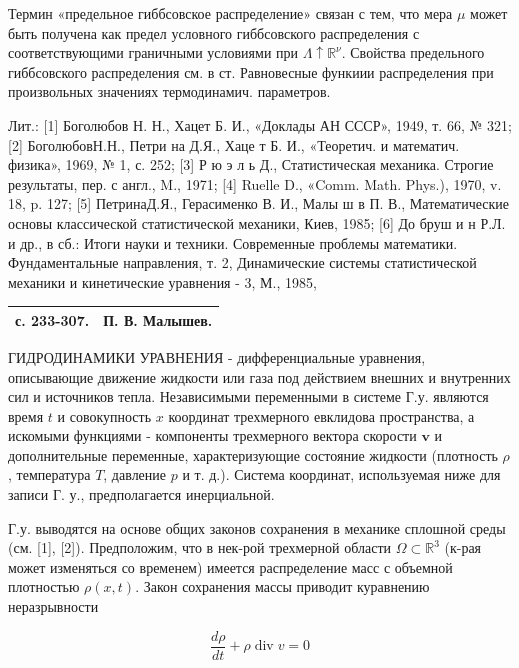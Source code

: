 \documentclass[10pt]{article}
\begin{document}
Термин «предельное гиббсовское распределение» связан с тем, что мера $\mu$ может быть получена как предел условного гиббсовского распределения с соответствующими граничными условиями при $\Lambda \uparrow \mathbb{R}^{\nu}$. Свойства предельного гиббсовского распределения см. в ст. Равновесные функиии распределения при произвольных значениях термодинамич. параметров.



Лит.: [1] Боголюбов Н. Н., Хацет Б. И., «Доклады АН СССР», 1949, т. 66, № 321; [2] БоголюбовН.Н., Петри на Д.Я., Хаце т Б. И., «Теоретич. и математич. физика», 1969, № 1, с. 252; [3] Р ю э л ь Д., Статистическая механика. Строгие результаты, пер. с англ., M., 1971; [4] Ruelle D., «Comm. Math. Phys.), 1970, v. 18, p. 127; [5] ПетринаД.Я., Герасименко В. И., Малы ш в П. В., Математические основы классической статистической механики, Киев, 1985; [6] До бруш и н Р.Л. и др., в сб.: Итоги науки и техники. Современные проблемы математики. Фундаментальные направления, т. 2, Динамические системы статистической механики и кинетические уравнения - 3, М., 1985, \begin{tabular}{ll}

с. 233-307. & П. В. Малышев. \\

\hline

\end{tabular}



ГИДРОДИНАМИКИ УРАВНЕНИЯ - дифференциальные уравнения, описывающие движение жидкости или газа под действием внешних и внутренних сил и источников тепла. Независимыми переменными в системе Г.у. являются время $t$ и совокупность $x$ координат трехмерного евклидова пространства, а искомыми функциями - компоненты трехмерного вектора скорости $\boldsymbol{v}$ и дополнительные переменные, характеризующие состояние жидкости (плотность $\rho$, температура $T$, давление $p$ и т. д.). Система координат, используемая ниже для записи Г. у., предполагается инерциальной.



Г.у. выводятся на основе общих законов сохранения в механике сплошной среды (см. [1], [2]). Предположим, что в нек-рой трехмерной области $\Omega \subset \mathbb{R}^{3}$ (к-рая может изменяться со временем) имеется распределение масс с объемной плотностью $\rho(x, t)$. Закон сохранения массы приводит куравнению неразрывности



\[

\frac{d \rho}{d t}+\rho \operatorname{div} v=0

\]
\end{document}
